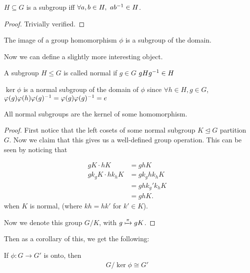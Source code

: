 \documentclass[12pt, twosided]{article}
\begin{document}
\begin{lm}
  \(H \subseteq G\) is a subgroup iff \(\forall a, b \in H,\ ab^{-1} \in H\).
\end{lm}
\begin{proof}
  Trivially verified.
\end{proof}

\begin{exa}
  The image of a group homomorphism \(\phi\) is a subgroup of the domain.
\end{exa}

Now we can define a slightly more interesting object.

\begin{df}
  A subgroup \(H \leq G\) is called \textrm{normal} if \(g\in G\) \(gHg^{-1} \in H\)
\end{df}

\begin{exa}
  \(\ker \phi\) is a normal subgroup of the domain of \(\phi\) since \(\forall h \in H, g \in G\), \(\varphi(g)\varphi(h)\varphi(g)^{-1} = \varphi(g)\varphi(g)^{-1} = e\)
\end{exa}

\begin{clm}
  All normal subgroups are the kernel of some homomorphism.
\end{clm}
\begin{proof}
  First notice that the left cosets of some normal subgroup \(K \trianglelefteq G\) partition \(G\). Now we claim that this gives us a well-defined group operation. This can be seen by noticing that

  \begin{align*}
    gK \cdot hK &= ghK \\
    gk_gK \cdot hk_hK &= gk_ghk_hK\\
                &= ghk_g\prime k_hK \\
                &=ghK.  
  \end{align*}
  when \(K\) is normal, (where \(kh = hk\prime\) for \(k\prime \in K\)).

  Now we denote this group \(G / K\), with \(g \xmapsto{\pi} gK\).
\end{proof}

Then as a corollary of this, we get the following:

\begin{cor}
  If \(\phi: G \to G\prime\) is onto, then
  \begin{align*}
    G / \ker{\phi} \cong G\prime
  \end{align*}
\end{cor}
\end{document}
